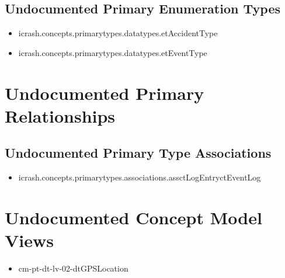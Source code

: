\subsection[Undocumented Primary Enumeration Types]{Undocumented Primary Enumeration Types}
\begin{itemize}
\item icrash.concepts.primarytypes.datatypes.etAccidentType 
\item icrash.concepts.primarytypes.datatypes.etEventType 
\end{itemize}






\section[Undocumented Primary Type Relationships]{Undocumented Primary Relationships}

\subsection[Undocumented Primary Type Associations]{Undocumented Primary Type Associations}
\begin{itemize}
\item icrash.concepts.primarytypes.associations.assctLogEntryctEventLog 
\end{itemize}












\section[Undocumented Concept Model Views]{Undocumented Concept Model Views}
\begin{itemize}
\item cm-pt-dt-lv-02-dtGPSLocation 
\end{itemize}


